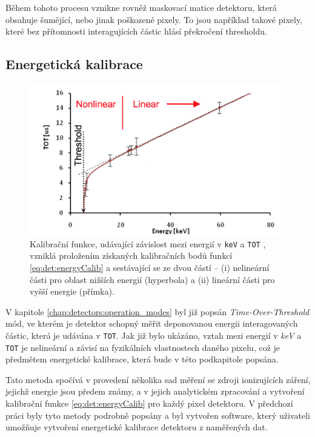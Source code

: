 Během tohoto procesu vznikne rovněž maskovací matice detektoru, která obsahuje šumějící, nebo jinak poškozené pixely. To jsou například takové pixely, které bez přítomnosti interagujících částic hlásí překročení thresholdu.

\subsection{Energetická kalibrace}\label{chap:detectors:calibration:energy}
\begin{figure}[th]
	\begin{center}
		\includegraphics[width=13cm]{figures/calib_function.png}
		\caption{Kalibrační funkce, udávající závislost mezi energií v \texttt{keV} a \texttt{TOT} \cite{Jakubek2011S262}, vzniklá proložením získaných kalibračních bodů funkcí \ref{eq:det:energyCalib} a sestávající se ze dvou částí -- (i) nelineární části pro oblast nižších energií (hyperbola) a (ii) lineární části pro vyšší energie (přímka).}
		\label{fig:det:calib:calib_function}
	\end{center}
\end{figure}

V kapitole \ref{chap:detectors:operation_modes} byl již popsán \textit{Time-Over-Threshold} mód, ve kterém je detektor schopný měřit deponovanou energii interagovaných částic, která je udávána v \texttt{TOT}. Jak již bylo ukázáno, vztah mezi energií v \textit{keV} a \texttt{TOT} je nelineární a závisí na fyzikálních vlastnostech daného pixelu, což je předmětem energetické kalibrace, která bude v této podkapitole popsána.

Tato metoda \cite{Jakubek2011S262} spočívá v provedení několika sad měření se zdroji ionizujících záření, jejichž energie jsou předem známy, a v jejich analytickém zpracování a vytvoření kalibrační funkce \ref{eq:det:energyCalib} pro každý pixel detektoru. V předchozí práci \cite{BegeraBcThesis2016} byly tyto metody podrobně popsány a byl vytvořen software, který uživateli umožňuje vytvoření energetické kalibrace detektoru z naměřených dat.

